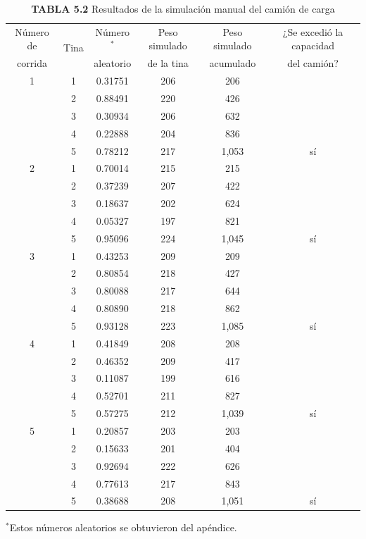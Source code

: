 \documentclass[11pt,letterpaper]{report}
\begin{document}
\begin{table}[H]
\centering
\caption*{\textbf{TABLA 5.2} Resultados de la simulación manual del camión de carga}
\begin{tabular}{cccccc}
\toprule
Número de & \multirow{2}{*}{Tina} & Número$^{*}$ & Peso simulado & Peso simulado & ¿Se excedió la capacidad \\
corrida & & aleatorio & de la tina & acumulado & del camión? \\
\midrule
1 & 1 & 0.31751 & 206 & 206 &    \\
  & 2 & 0.88491 & 220 & 426 &    \\
  & 3 & 0.30934 & 206 & 632 &    \\
  & 4 & 0.22888 & 204 & 836 &    \\
  & 5 & 0.78212 & 217 & 1{,}053 & sí \\[3pt]
2 & 1 & 0.70014 & 215 & 215 &    \\
  & 2 & 0.37239 & 207 & 422 &    \\
  & 3 & 0.18637 & 202 & 624 &    \\
  & 4 & 0.05327 & 197 & 821 &    \\
  & 5 & 0.95096 & 224 & 1{,}045 & sí \\[3pt]
3 & 1 & 0.43253 & 209 & 209 &    \\
  & 2 & 0.80854 & 218 & 427 &    \\
  & 3 & 0.80088 & 217 & 644 &    \\
  & 4 & 0.80890 & 218 & 862 &    \\
  & 5 & 0.93128 & 223 & 1{,}085 & sí \\[3pt]
4 & 1 & 0.41849 & 208 & 208 &    \\
  & 2 & 0.46352 & 209 & 417 &    \\
  & 3 & 0.11087 & 199 & 616 &    \\
  & 4 & 0.52701 & 211 & 827 &    \\
  & 5 & 0.57275 & 212 & 1{,}039 & sí \\[3pt]
5 & 1 & 0.20857 & 203 & 203 &    \\
  & 2 & 0.15633 & 201 & 404 &    \\
  & 3 & 0.92694 & 222 & 626 &    \\
  & 4 & 0.77613 & 217 & 843 &    \\
  & 5 & 0.38688 & 208 & 1{,}051 & sí \\
\bottomrule
\end{tabular}

\vspace{2pt}
{\footnotesize $^{*}$Estos números aleatorios se obtuvieron del apéndice.}
\end{table}
\end{document}
